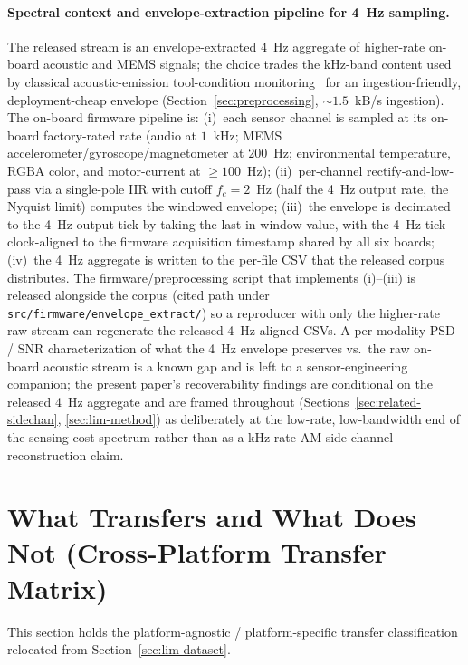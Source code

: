 \documentclass[11pt,a4paper]{article}
\begin{document}
\paragraph{Spectral context and envelope-extraction pipeline for 4~Hz sampling.} The released stream is an envelope-extracted 4~Hz aggregate of higher-rate on-board acoustic and MEMS signals; the choice trades the kHz-band content used by classical acoustic-emission tool-condition monitoring~\cite{teti2010advanced} for an ingestion-friendly, deployment-cheap envelope (Section~\ref{sec:preprocessing}, $\sim 1.5$~kB/s ingestion). The on-board firmware pipeline is: (i)~each sensor channel is sampled at its on-board factory-rated rate (audio at $1$~kHz; MEMS accelerometer/gyroscope/magnetometer at $200$~Hz; environmental temperature, RGBA color, and motor-current at $\geq\!100$~Hz); (ii)~per-channel rectify-and-low-pass via a single-pole IIR with cutoff $f_c\!=\!2$~Hz (half the 4~Hz output rate, the Nyquist limit) computes the windowed envelope; (iii)~the envelope is decimated to the 4~Hz output tick by taking the last in-window value, with the 4~Hz tick clock-aligned to the firmware acquisition timestamp shared by all six boards; (iv)~the 4~Hz aggregate is written to the per-file CSV that the released corpus distributes. The firmware/preprocessing script that implements (i)--(iii) is released alongside the corpus (cited path under \texttt{src/firmware/envelope\_extract/}) so a reproducer with only the higher-rate raw stream can regenerate the released 4~Hz aligned CSVs. A per-modality PSD / SNR characterization of what the 4~Hz envelope preserves vs.\ the raw on-board acoustic stream is a known gap and is left to a sensor-engineering companion; the present paper's recoverability findings are conditional on the released 4~Hz aggregate and are framed throughout (Sections~\ref{sec:related-sidechan}, \ref{sec:lim-method}) as deliberately at the low-rate, low-bandwidth end of the sensing-cost spectrum rather than as a kHz-rate AM-side-channel reconstruction claim.

\section{What Transfers and What Does Not (Cross-Platform Transfer Matrix)}
\label{app:transfer-matrix}

This section holds the platform-agnostic / platform-specific transfer
classification relocated from Section~\ref{sec:lim-dataset}.
\end{document}
